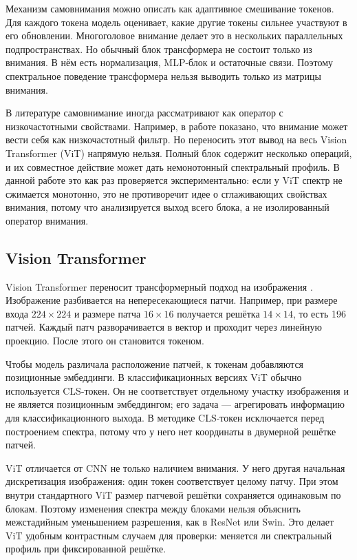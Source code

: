 Механизм самовнимания можно описать как адаптивное смешивание токенов. Для каждого токена модель оценивает, какие другие токены сильнее участвуют в его обновлении. Многоголовое внимание делает это в нескольких параллельных подпространствах. Но обычный блок трансформера не состоит только из внимания. В нём есть нормализация, MLP-блок и остаточные связи. Поэтому спектральное поведение трансформера нельзя выводить только из матрицы внимания.

В литературе самовнимание иногда рассматривают как оператор с низкочастотными свойствами. Например, в работе \cite{park2022how} показано, что внимание может вести себя как низкочастотный фильтр. Но переносить этот вывод на весь Vision Transformer (ViT)  напрямую нельзя. Полный блок содержит несколько операций, и их совместное действие может дать немонотонный спектральный профиль. В данной работе это как раз проверяется экспериментально: если у ViT спектр не сжимается монотонно, это не противоречит идее о сглаживающих свойствах внимания, потому что анализируется выход всего блока, а не изолированный оператор внимания.

\subsection{Vision Transformer}

Vision Transformer переносит трансформерный подход на изображения \cite{dosovitskiy2021image}. Изображение разбивается на непересекающиеся патчи. Например, при размере входа $224\times224$ и размере патча $16\times16$ получается решётка $14\times14$, то есть 196 патчей. Каждый патч разворачивается в вектор и проходит через линейную проекцию. После этого он становится токеном.

Чтобы модель различала расположение патчей, к токенам добавляются позиционные эмбеддинги. В классификационных версиях ViT обычно используется CLS-токен. Он не соответствует отдельному участку изображения и не является позиционным эмбеддингом; его задача — агрегировать информацию для классификационного выхода. В методике CLS-токен исключается перед построением спектра, потому что у него нет координаты в двумерной решётке патчей.

ViT отличается от CNN не только наличием внимания. У него другая начальная дискретизация изображения: один токен соответствует целому патчу. При этом внутри стандартного ViT размер патчевой решётки сохраняется одинаковым по блокам. Поэтому изменения спектра между блоками нельзя объяснить межстадийным уменьшением разрешения, как в ResNet или Swin. Это делает ViT удобным контрастным случаем для проверки: меняется ли спектральный профиль при фиксированной решётке.

